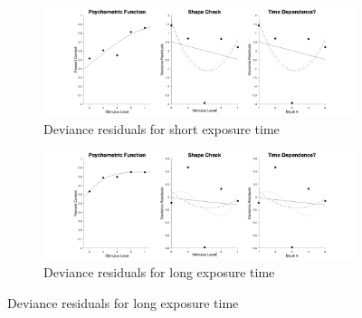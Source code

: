 \documentclass{article}
\begin{document}
\begin{figure}[!hb]
    \begin{subfigure}{\textwidth}
        \centering
        \includegraphics[width = \linewidth]{Thesis/plots/gof/cutNo/cutNo_mae_short_deviance.png}
        \caption{Deviance residuals for short exposure time}
    \end{subfigure}
    \begin{subfigure}{\textwidth}
        \centering
        \includegraphics[width = \linewidth]{Thesis/plots/gof/cutNo/cutNo_mae_long_deviance.png}
        \caption{Deviance residuals for long exposure time}
    \end{subfigure}
\end{figure}

\clearpage
\end{document}
